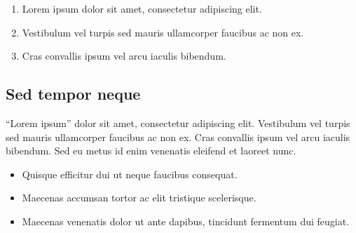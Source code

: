 \begin{enumerate}
  \item Lorem ipsum dolor sit amet, consectetur adipiscing elit.
  \item Vestibulum vel turpis sed mauris ullamcorper faucibus ac non ex.
  \item Cras convallis ipsum vel arcu iaculis bibendum.
\end{enumerate}

\subsection{Sed tempor neque}\label{subsec:sed}

``Lorem ipsum'' dolor sit amet, consectetur adipiscing elit.
Vestibulum vel turpis sed mauris ullamcorper faucibus ac non ex.
Cras convallis ipsum vel arcu iaculis bibendum.
Sed eu metus id enim venenatis eleifend et laoreet nunc.

\begin{itemize}
  \item Quisque efficitur dui ut neque faucibus consequat.
  \item Maecenas accumsan tortor ac elit tristique scelerisque.
  \item Maecenas venenatis dolor ut ante dapibus, tincidunt fermentum dui feugiat.
\end{itemize}
